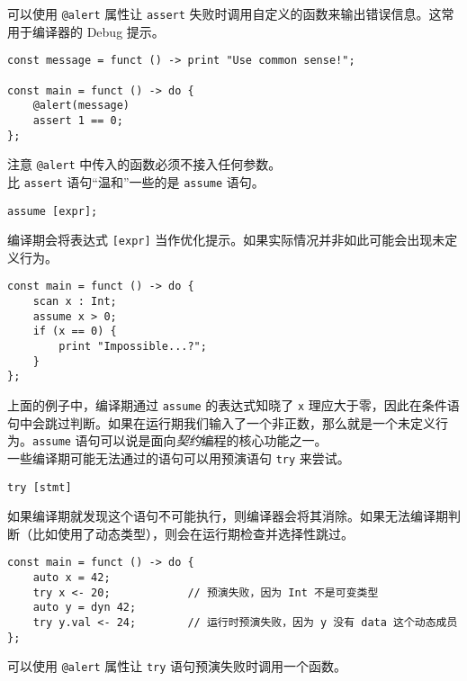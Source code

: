 可以使用 \lstinline!@alert! 属性让 \lstinline!assert! 失败时调用自定义的函数来输出错误信息。这常用于编译器的 Debug 提示。

\begin{lstlisting}
const message = funct () -> print "Use common sense!";

const main = funct () -> do {
    @alert(message)
    assert 1 == 0;
};
\end{lstlisting}

注意 \lstinline!@alert! 中传入的函数必须不接入任何参数。 \\

比 \lstinline!assert! 语句“温和”一些的是 \lstinline!assume! 语句。

\begin{grammar} \label{grm:assume-statement}
    \lstinline!assume [expr];!
\end{grammar}

编译期会将表达式 \lstinline![expr]! 当作优化提示。如果实际情况并非如此可能会出现未定义行为。

\begin{lstlisting}
const main = funct () -> do {
    scan x : Int;
    assume x > 0;
    if (x == 0) {
        print "Impossible...?";
    }
};
\end{lstlisting}

上面的例子中，编译期通过 \lstinline!assume! 的表达式知晓了 \lstinline!x! 理应大于零，因此在条件语句中会跳过判断。如果在运行期我们输入了一个非正数，那么就是一个未定义行为。\lstinline!assume! 语句可以说是面向\emph{契约}编程的核心功能之一。 \\

一些编译期可能无法通过的语句可以用预演语句 \lstinline!try! 来尝试。

\begin{grammar} \label{grm:try-statement}
    \lstinline!try [stmt]!
\end{grammar}

如果编译期就发现这个语句不可能执行，则编译器会将其消除。如果无法编译期判断（比如使用了动态类型），则会在运行期检查并选择性跳过。

\begin{lstlisting}
const main = funct () -> do {
    auto x = 42;
    try x <- 20;            // 预演失败，因为 Int 不是可变类型
    auto y = dyn 42;
    try y.val <- 24;		// 运行时预演失败，因为 y 没有 data 这个动态成员
};
\end{lstlisting}

可以使用 \lstinline!@alert! 属性让 \lstinline!try! 语句预演失败时调用一个函数。

